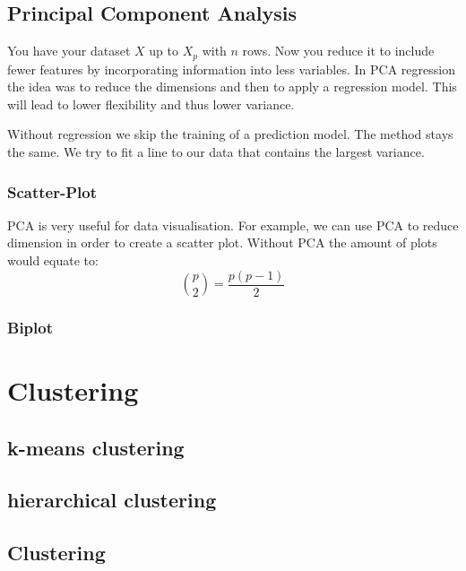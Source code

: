 \documentclass[../Main.tex]{subfiles}
\begin{document}
\subsection{Principal Component Analysis}
You have your dataset \(X\) up to \(X_p\) with \(n\) rows.
Now you reduce it to include fewer features by incorporating
information into less variables. In PCA regression the idea
was to reduce the dimensions and then to apply a regression model.
This will lead to lower flexibility and thus lower variance.

Without regression we skip the training of a prediction model.
The method stays the same. We try to fit a line to our data
that contains the largest variance.

\subsubsection{Scatter-Plot}
PCA is very useful for data visualisation. For example, we
can use PCA to reduce dimension in order to create a scatter plot.
Without PCA the amount of plots would equate to:
\begin{equation}
    \binom{p}{2} = \frac{p(p-1)}{2}
\end{equation}

\subsubsection{Biplot}

\section{Clustering}
\subsection{k-means clustering}
\subsection {hierarchical clustering}


\subsection{Clustering}
\end{document}
